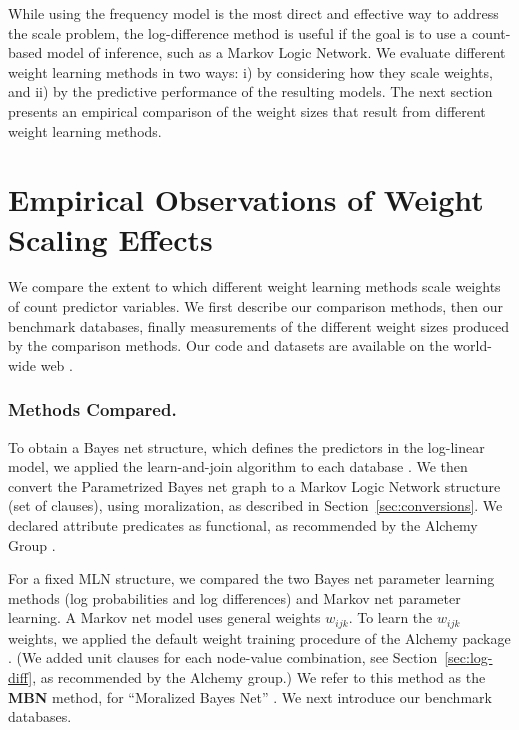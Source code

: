 \documentclass[twoside,leqno,twocolumn]{article}
\begin{document}

%

While using the frequency model is the most direct and effective way to address the scale problem, the log-difference method is useful if the goal is to use a count-based model of inference, such as a Markov Logic Network.
We evaluate different weight learning methods in two ways: i) by considering how they scale weights, and ii) by the predictive performance of the resulting models. The next section presents an empirical comparison of the weight sizes that result from different weight learning methods.

\section{Empirical Observations of Weight Scaling Effects}

We compare the extent to which different weight learning methods scale weights of count predictor variables. We first describe our comparison methods, then our benchmark databases, finally measurements of the different weight sizes produced by the comparison methods. Our code and datasets are available on the world-wide web \cite{bib:jbnsite}. 

\subsubsection{Methods Compared.} \label{sec:methods}

To obtain a Bayes net structure, which defines the predictors in the log-linear model, we applied the learn-and-join algorithm to each database %
\cite{Schulte2012}. 
We then convert the Parametrized Bayes net graph to a Markov Logic Network structure (set of clauses), using moralization, as described in Section~\ref{sec:conversions}.
We declared attribute predicates as functional, as recommended by the Alchemy Group \cite{bib:bayes-convert}. 

For a fixed MLN structure, we compared the two Bayes net parameter learning methods (log probabilities and log differences) and Markov net parameter learning. 
%
%
A Markov net model uses general weights $w_{ijk}$.
To learn the $w_{ijk}$ weights, we applied the default weight training procedure \cite{Lowd2007} of the Alchemy package \cite{Kok2009a}. (We added unit clauses for each node-value combination, see Section~\ref{sec:log-diff}, as recommended by the Alchemy group.)  We refer to this method as the \textbf{MBN} method, for ``Moralized Bayes Net''   \cite{Khosravi2010}. 
%
 We next introduce our benchmark databases.
\end{document}
